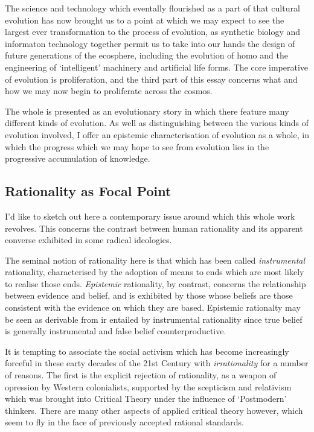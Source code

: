 \documentclass[10pt,titlepage]{book}
\begin{document}
The science and technology which eventally flourished as a part of that cultural evolution has now brought us to a point at which we may expect to see the largest ever transformation to the process of evolution, as synthetic biology and informaton technology together permit us to take into our hands the design of future generations of the ecosphere, including the evolution of homo and the engineering of `intelligent' machinery and artificial life forms.
The core imperative of evolution is proliferation, and the third part of this essay concerns what and how we may now begin to proliferate across the cosmos.

The whole is presented as an evolutionary story in which there feature many different kinds of evolution.
As well as distinguishing between the various kinds of evolution involved, I offer an epistemic characterisation of evolution as a whole, in which the progress which we may hope to see from evolution lies in the progressive accumulation of knowledge.

\subsection{Rationality as Focal Point}

I'd like to sketch out here a contemporary issue around which this whole work revolves.
This concerns the contrast between human rationality and its apparent converse exhibited in some radical ideologies.

The seminal notion of rationality here is that which has been called \emph{instrumental} rationality, characterised by the adoption of means to ends which are most likely to realise those ends.
\emph{Epistemic} rationality, by contrast, concerns the relationship between evidence and belief, and is exhibited by those whose beliefs are those consistent with the evidence on which they are based.
Epistemic rationalty may be seen as derivable from ir entailed by instrumental rationality since true belief is generally instrumental and false belief counterproductive.

It is tempting to associate the social activism which has become increasingly forceful in these earty decades of the 21st Century with \emph{irrationality} for a number of reasons.
The first is the explicit rejection of rationality, as a weapon of opression by Western colonialists, supported by the scepticism and relativism which was brought into Critical Theory under the influence of `Postmodern' thinkers.
There are many other aspects of applied critical theory however, which seem to fly in the face of previously accepted rational standards.
\end{document}
